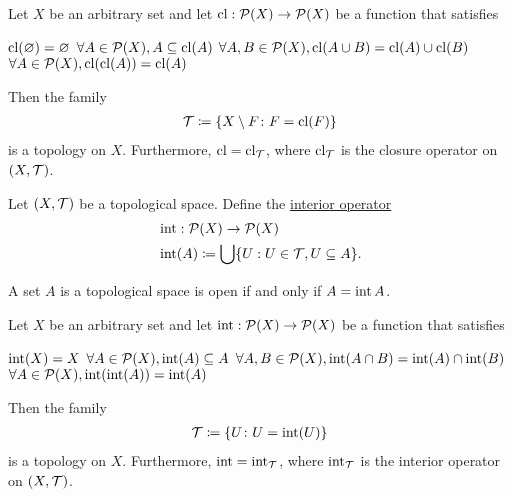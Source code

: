 \begin{proposition}\label{thm:closure_operator_axioms}\cite[14]{Engelking1989}
  Let $X$ be an arbitrary set and let $\operatorname{cl}: \operatorname{\mathcal P}(X) \to \operatorname{\mathcal P}(X)$ be a function that satisfies
  \begin{description}
     $\operatorname{cl}(\varnothing) = \varnothing$
     $\forall A \in \operatorname{\mathcal P}(X), A \subseteq \operatorname{cl}(A)$
     $\forall A, B \in \operatorname{\mathcal P}(X), \operatorname{cl}(A \cup B) = \operatorname{cl}(A) \cup \operatorname{cl}(B)$
     $\forall A \in \operatorname{\mathcal P}(X), \operatorname{cl}(\operatorname{cl}(A)) = \operatorname{cl}(A)$
  \end{description}

  Then the family
  \begin{align*}
    \mathcal T \coloneqq \{ X \setminus F \colon F = \operatorname{cl}(F) \}
  \end{align*}
  is a topology on $X$. Furthermore, $\operatorname{cl} = \operatorname{cl}_{\mathcal T}$, where $\operatorname{cl}_{\mathcal T}$ is the closure operator on $(X, \mathcal T)$.
\end{proposition}

\begin{definition}\label{def:interior_operator}\cite[15]{Engelking1989}
  Let $(X, \mathcal T)$ be a topological space. Define the \ul{interior operator}
  \begin{align*}
    &\operatorname{int}: \operatorname{\mathcal P}(X) \to \operatorname{\mathcal P}(X) \\
    &\operatorname{int}(A) \coloneqq \bigcup \{ U : U \in \mathcal T, U \subseteq A \}.
  \end{align*}
\end{definition}

\begin{proposition}\label{thm:set_open_iff_matches_interior}
  A set $A$ is a topological space is open if and only if $A = \operatorname{int} A$.
\end{proposition}

\begin{proposition}\label{thm:interior_operator_axioms}
  Let $X$ be an arbitrary set and let $\operatorname{int}: \operatorname{\mathcal P}(X) \to \operatorname{\mathcal P}(X)$ be a function that satisfies
  \begin{description}
     $\operatorname{int}(X) = X$
     $\forall A \in \operatorname{\mathcal P}(X), \operatorname{int}(A) \subseteq A$
     $\forall A, B \in \operatorname{\mathcal P}(X), \operatorname{int}(A \cap B) = \operatorname{int}(A) \cap \operatorname{int}(B)$
     $\forall A \in \operatorname{\mathcal P}(X), \operatorname{int}(\operatorname{int}(A)) = \operatorname{int}(A)$
  \end{description}

  Then the family
  \begin{align*}
    \mathcal T \coloneqq \{ U \colon U = \operatorname{int}(U) \}
  \end{align*}
  is a topology on $X$. Furthermore, $\operatorname{int} = \operatorname{int}_{\mathcal T}$, where $\operatorname{int}_{\mathcal T}$ is the interior operator on $(X, \mathcal T)$.
\end{proposition}

